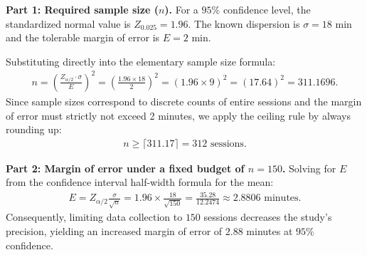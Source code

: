 \begin{solucion}
	\textbf{Part 1: Required sample size ($n$).}
	For a $95\%$ confidence level, the standardized normal value is $Z_{0.025} = 1.96$. The known dispersion is $\sigma = 18$ min and the tolerable margin of error is $E = 2$ min.
	
	Substituting directly into the elementary sample size formula:
	\begin{align}
		n = \left( \frac{Z_{\alpha/2} \cdot \sigma}{E} \right)^2 = \left( \frac{1.96 \times 18}{2} \right)^2 = (1.96 \times 9)^2 = (17.64)^2 = 311.1696.
	\end{align}
	Since sample sizes correspond to discrete counts of entire sessions and the margin of error must strictly not exceed 2 minutes, we apply the ceiling rule by always rounding up:
	\begin{align}
		n \geq \lceil 311.17 \rceil = 312 \text{ sessions.}
	\end{align}
	
	\textbf{Part 2: Margin of error under a fixed budget of $n = 150$.}
	Solving for $E$ from the confidence interval half-width formula for the mean:
	\begin{align}
		E = Z_{\alpha/2} \frac{\sigma}{\sqrt{n}} = 1.96 \times \frac{18}{\sqrt{150}} = \frac{35.28}{12.2474} \approx 2.8806 \text{ minutes.}
	\end{align}
	Consequently, limiting data collection to $150$ sessions decreases the study's precision, yielding an increased margin of error of $2.88$ minutes at $95\%$ confidence.
\end{solucion}

